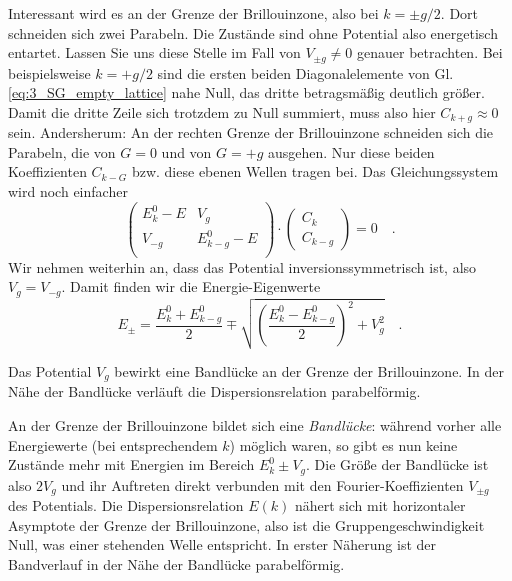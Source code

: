 Interessant wird es an der Grenze der Brillouinzone, also bei $k = \pm g/2$. Dort schneiden sich zwei Parabeln. Die Zustände sind ohne Potential also energetisch entartet. Lassen Sie uns diese Stelle im Fall von  $V_{\pm g} \neq 0$ genauer betrachten. Bei beispielsweise $k = + g/2$  sind die ersten beiden Diagonalelemente von Gl. \ref{eq:3_SG_empty_lattice} nahe Null, das dritte betragsmäßig deutlich größer. Damit die dritte Zeile sich trotzdem zu Null summiert, muss also hier $C_{k+g} \approx 0$ sein. Andersherum: An der rechten Grenze der Brillouinzone schneiden sich die Parabeln, die von $G =0$ und von $G=+g$ ausgehen. Nur diese beiden Koeffizienten $C_{k-G}$ bzw. diese ebenen Wellen tragen bei. Das Gleichungssystem wird noch einfacher 
\begin{equation}
    \begin{pmatrix}
        E_k^0 - E &  V_{g}  \\
     V_{-g}  &   E_{k - g}^0 - E   \\
 \end{pmatrix}
   \cdot
   \begin{pmatrix}
     C_{k} \\  C_{k - g} 
   \end{pmatrix}
  = 0 \quad . \label{eq:3_SG_empty_lattice_2}
 \end{equation}
Wir nehmen weiterhin an, dass das Potential inversionssymmetrisch ist, also $V_g = V_{-g}$. Damit finden wir die Energie-Eigenwerte
\begin{equation}
    E_\pm = \frac{ E_k^0 +   E_{k-g}^0}{2} \mp \sqrt{  \left( \frac{ E_k^0 -   E_{k-g}^0}{2} \right)^2 + V_g^2 }  \quad .
\end{equation}

\begin{marginfigure}
    \caption{Das Potential $V_g$ bewirkt eine Bandlücke an der Grenze der Brillouinzone. In der Nähe der Bandlücke verläuft die Dispersionsrelation parabelförmig.}
\end{marginfigure}

An der Grenze der Brillouinzone bildet sich eine \emph{Bandlücke}: während vorher alle Energiewerte (bei entsprechendem $k$) möglich waren, so gibt es nun keine Zustände mehr mit Energien  im Bereich $E_k^0   \pm  V_g$. Die Größe der Bandlücke ist also $2 V_g$ und ihr Auftreten direkt verbunden mit den Fourier-Koeffizienten $V_{\pm g}$ des Potentials.
Die Dispersionsrelation $E(k)$ nähert sich mit horizontaler Asymptote der Grenze der Brillouinzone, also ist die Gruppengeschwindigkeit Null, was einer stehenden Welle entspricht. In erster Näherung ist der Bandverlauf in der Nähe der Bandlücke parabelförmig. 

